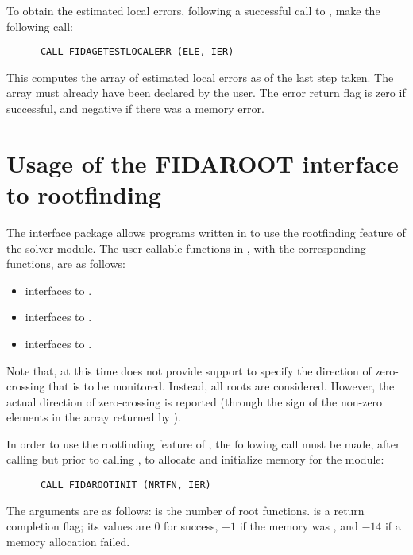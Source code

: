 To obtain the estimated local errors, following a successful call to
, make the following call:
\begin{verbatim}
      CALL FIDAGETESTLOCALERR (ELE, IER)
\end{verbatim}
This computes the  array of estimated local errors as of the last
step taken.  The array  must already have been declared by the user.
The error return flag  is zero if successful, and negative if there
was a memory error.

\section{Usage of the FIDAROOT interface to rootfinding}

The {\fidaroot} interface package allows programs written in {\F} to
use the rootfinding feature of the {\ida} solver module.
The user-callable functions in {\fidaroot}, with the corresponding
{\ida} functions, are as follows: 
\begin{itemize}
  \item {} interfaces to .
  \item {} interfaces to .
  \item {} interfaces to .
\end{itemize}
Note that, at this time {\fidaroot} does not provide support to
specify the direction of zero-crossing that is to be monitored. 
Instead, all roots are considered. However, the actual direction
of zero-crossing is reported (through the sign of the non-zero
elements in the array  returned by ).

In order to use the rootfinding feature of {\ida}, the following call must
be made, after calling  but prior to calling ,
to allocate and initialize memory for the  module:
\begin{verbatim}
      CALL FIDAROOTINIT (NRTFN, IER)
\end{verbatim}
The arguments are as follows:
 is the number of root functions.
 is a return completion flag; its values are $0$ for success, $-1$ 
if the  memory was , and $-14$ if a memory allocation failed.

